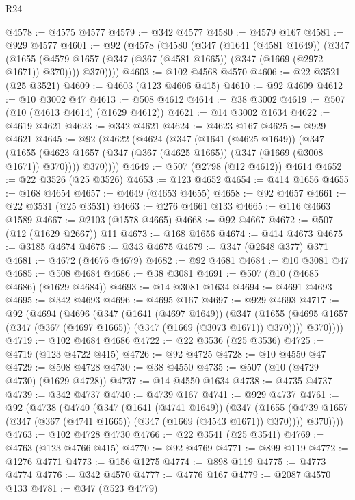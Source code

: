 \begin{lexlean}{R24}
\begin{coremodule}
{{{{{{{{{{{{{{{{{{{{{{{{{{{{{{{{{{{{{{{{{{{{{{{{{{{{{{{{{{{{{{{{{{{{{{{{{{{{{{{{{{{{{{{{{{{{{{{{{{{{{{{{{{{{{{{{{{{{{{{{{{{{{{{{{{{{{{{{{{{{{{{{{{{{{{{{{{{{{{{{{{{{{{{{{{{{{{{{{{{{{{{{{{{{{{{{{{{@4578 := @4575 @4577
@4579 := @342 @4577
@4580 := @4579 @167
@4581 := @929 @4577
@4601 := @92
    (@4578
      (@4580
        (@347
          (@1641 (@4581 @1649))
          (@347
            (@1655 (@4579 @1657 (@347 (@367 (@4581 @1665)) (@347 (@1669 (@2972 @1671)) @370))))
            @370))))
@4603 := @102 @4568 @4570
@4606 := @22 @3521 (@25 @3521)
@4609 := @4603 (@123 @4606 @415)
@4610 := @92 @4609
@4612 := @10 @3002 @47
@4613 := @508 @4612
@4614 := @38 @3002
@4619 := @507 (@10 (@4613 @4614) (@1629 @4612))
@4621 := @14 @3002 @1634
@4622 := @4619 @4621
@4623 := @342 @4621
@4624 := @4623 @167
@4625 := @929 @4621
@4645 := @92
    (@4622
      (@4624
        (@347
          (@1641 (@4625 @1649))
          (@347
            (@1655 (@4623 @1657 (@347 (@367 (@4625 @1665)) (@347 (@1669 (@3008 @1671)) @370))))
            @370))))
@4649 := @507 (@2798 (@12 @4612)) @4614
@4652 := @22 @3526 (@25 @3526)
@4653 := @123 @4652
@4654 := @414 @1656
@4655 := @168 @4654
@4657 := @4649 (@4653 @4655)
@4658 := @92 @4657
@4661 := @22 @3531 (@25 @3531)
@4663 := @276 @4661 @133
@4665 := @116 @4663 @1589
@4667 := @2103 (@1578 @4665)
@4668 := @92 @4667
@4672 := @507 (@12 (@1629 @2667)) @11
@4673 := @168 @1656
@4674 := @414 @4673
@4675 := @3185 @4674
@4676 := @343 @4675
@4679 := @347 (@2648 @377) @371
@4681 := @4672 (@4676 @4679)
@4682 := @92 @4681
@4684 := @10 @3081 @47
@4685 := @508 @4684
@4686 := @38 @3081
@4691 := @507 (@10 (@4685 @4686) (@1629 @4684))
@4693 := @14 @3081 @1634
@4694 := @4691 @4693
@4695 := @342 @4693
@4696 := @4695 @167
@4697 := @929 @4693
@4717 := @92
    (@4694
      (@4696
        (@347
          (@1641 (@4697 @1649))
          (@347
            (@1655 (@4695 @1657 (@347 (@367 (@4697 @1665)) (@347 (@1669 (@3073 @1671)) @370))))
            @370))))
@4719 := @102 @4684 @4686
@4722 := @22 @3536 (@25 @3536)
@4725 := @4719 (@123 @4722 @415)
@4726 := @92 @4725
@4728 := @10 @4550 @47
@4729 := @508 @4728
@4730 := @38 @4550
@4735 := @507 (@10 (@4729 @4730) (@1629 @4728))
@4737 := @14 @4550 @1634
@4738 := @4735 @4737
@4739 := @342 @4737
@4740 := @4739 @167
@4741 := @929 @4737
@4761 := @92
    (@4738
      (@4740
        (@347
          (@1641 (@4741 @1649))
          (@347
            (@1655 (@4739 @1657 (@347 (@367 (@4741 @1665)) (@347 (@1669 (@4543 @1671)) @370))))
            @370))))
@4763 := @102 @4728 @4730
@4766 := @22 @3541 (@25 @3541)
@4769 := @4763 (@123 @4766 @415)
@4770 := @92 @4769
@4771 := @899 @119
@4772 := @1276 @4771
@4773 := @156 @1275
@4774 := @898 @119
@4775 := @4773 @4774
@4776 := @342 @4570
@4777 := @4776 @167
@4779 := @2087 @4570 @133
@4781 := @347 (@523 @4779)
}}}}}}}}}}}}}}}}}}}}}}}}}}}}}}}}}}}}}}}}}}}}}}}}}}}}}}}}}}}}}}}}}}}}}}}}}}}}}}}}}}}}}}}}}}}}}}}}}}}}}}}}}}}}}}}}}}}}}}}}}}}}}}}}}}}}}}}}}}}}}}}}}}}}}}}}}}}}}}}}}}}}}}}}}}}}}}}}}}}}}}}}}}}}}}}}}}}
\end{coremodule}
\end{lexlean}
